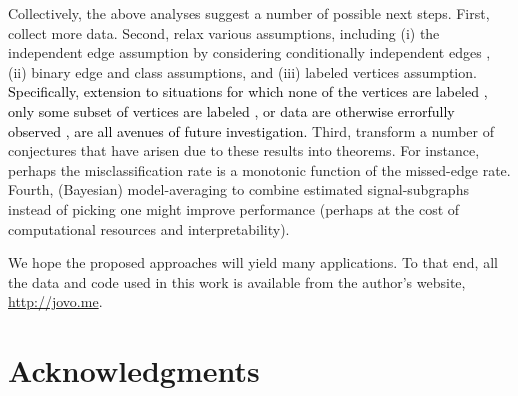 \documentclass[10pt,journal,cspaper,compsoc]{IEEEtran}
\providecommand{\tk}[1]{\textcolor{black}{#1}}
\begin{document}
Collectively, the above analyses suggest a number of possible next steps.  First, collect more data.  Second, relax various assumptions, including (i) the independent edge assumption by considering conditionally independent edges \cite{Hoff02,STFP,Fishkind2012}, (ii) binary edge and class assumptions, and (iii) labeled vertices assumption. 
\tk{Specifically, extension to situations for which none of the vertices are labeled \cite{VP11_QAP, VP11_unlabeled},  only some subset of vertices are labeled \cite{VN,BVN}, or data are otherwise errorfully observed \cite{Bock2011}, are all avenues of future investigation.}
Third, transform a number of conjectures that have arisen due to these results into theorems.  For instance, perhaps the misclassification rate is a monotonic function of the missed-edge rate.  Fourth, (Bayesian) model-averaging to combine estimated signal-subgraphs instead of picking one might improve performance (perhaps at the cost of computational resources and interpretability).  

We hope the proposed approaches will yield many applications.  To that end, all the data and code used in this work is available from the author's website, \url{http://jovo.me}.  

% 
% 
% 


% 

\ifCLASSOPTIONcompsoc
  \section*{Acknowledgments}
\else
\end{document}
